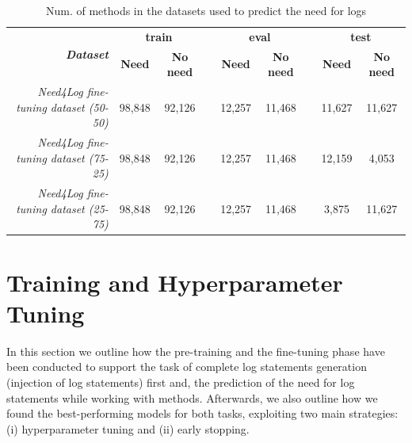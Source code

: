 \begin{table}[h!]
	\centering
	\caption{Num. of methods in the datasets used to predict the need for logs}
	\begin{tabular}{rcccccccc}
		\hline
		\multirow{2}{*}{\textit{\textbf{Dataset}}} & \multicolumn{2}{c}{\textbf{train}} & \textbf{} & \multicolumn{2}{c}{\textbf{eval}}  & \textbf{} & \multicolumn{2}{c}{\textbf{test}}  \\ \cline{2-3} \cline{5-6} \cline{8-9} 
		& \textbf{Need} & \textbf{No need}   & \textbf{} & \textbf{Need} & \textbf{No need}   & \textbf{} & \textbf{Need} & \textbf{No need}   \\ \hline
		\textit{Need4Log fine-tuning dataset (50-50)}         & 98,848        & 92,126             &           & 12,257        & 11,468             &           & 11,627        &  11,627            \\
		\textit{Need4Log fine-tuning dataset (75-25)}         & 98,848        & 92,126             &           & 12,257        & 11,468             &           & 12,159        &  4,053             \\
		\textit{Need4Log fine-tuning dataset (25-75)}         & 98,848        & 92,126             &           & 12,257        & 11,468             &           & 3,875         &  11,627            \\ \hline
	\end{tabular}
	\label{tab:ds-summary-2}
\end{table}

\section{Training and Hyperparameter Tuning} \label{sec:training}
In this section we outline how the pre-training and the fine-tuning phase have been conducted to support the task of complete log statements generation (\ie injection of log statements) first and, the prediction of the need for log statements while working with \java methods. Afterwards, we also outline how we found the best-performing models for both tasks, exploiting two main strategies: (i) hyperparameter tuning  and (ii) early stopping.

